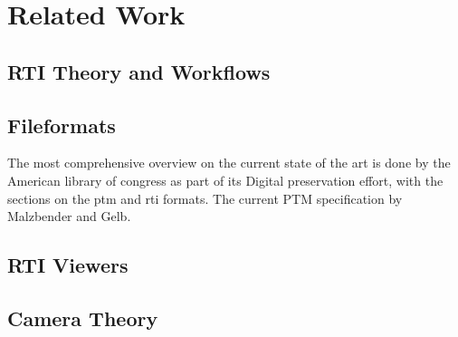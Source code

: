 \section{Related Work}

\subsection{RTI Theory and Workflows}

\subsection{Fileformats}
The most comprehensive overview on the current state of the art is done by the
American library of congress as part of its Digital preservation effort, with
the sections on the ptm\cite{library_of_congress_polynomial_2018} and
rti\cite{library_of_congress_reflectance_2018} formats. The current PTM
specification by Malzbender and Gelb\cite{malzbender_polynomial_nodate}.

\subsection{RTI Viewers}


\subsection{Camera Theory}
